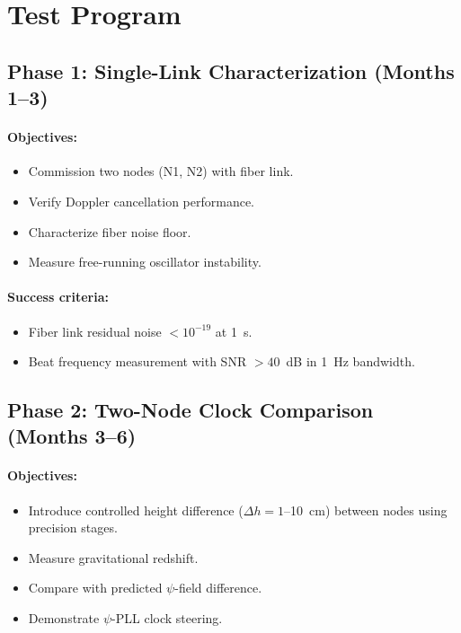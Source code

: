 \documentclass[12pt,letterpaper]{article}
\begin{document}
\section{Test Program}

\subsection{Phase 1: Single-Link Characterization (Months 1--3)}

\paragraph{Objectives:}
\begin{itemize}
\item Commission two nodes (N1, N2) with fiber link.
\item Verify Doppler cancellation performance.
\item Characterize fiber noise floor.
\item Measure free-running oscillator instability.
\end{itemize}

\paragraph{Success criteria:}
\begin{itemize}
\item Fiber link residual noise $< 10^{-19}$ at 1~s.
\item Beat frequency measurement with SNR $> 40$~dB in 1~Hz bandwidth.
\end{itemize}

\subsection{Phase 2: Two-Node Clock Comparison (Months 3--6)}

\paragraph{Objectives:}
\begin{itemize}
\item Introduce controlled height difference ($\Delta h = 1$--10~cm)
between nodes using precision stages.
\item Measure gravitational redshift.
\item Compare with predicted $\psi$-field difference.
\item Demonstrate $\psi$-PLL clock steering.
\end{itemize}
\end{document}
